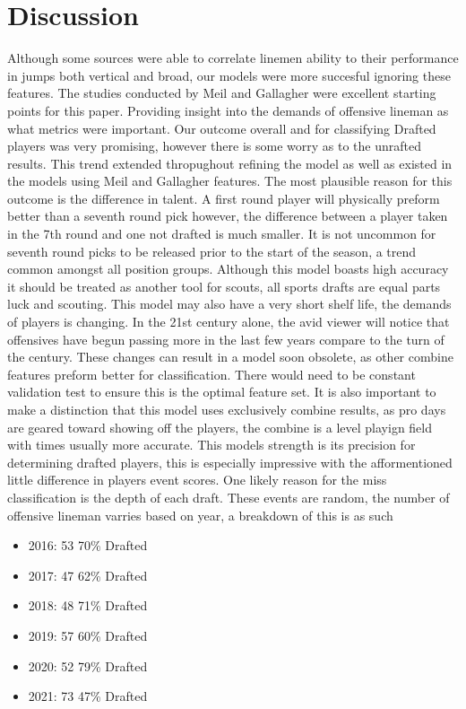 \documentclass[confrence]{IEEEtran}
\begin{document}
\section*{Discussion}
Although some sources were able to correlate linemen ability to their performance in jumps both vertical and broad, our models were more succesful ignoring these features.
The studies conducted by Meil and Gallagher were excellent starting points for this paper. Providing insight into the demands of offensive lineman as what metrics were important.
Our outcome overall and for classifying Drafted players was very promising, however there is some worry as to the unrafted results. 
This trend extended thropughout refining the model as well as existed in the models using Meil and Gallagher features.
The most plausible reason for this outcome is the difference in talent. A first round player will physically preform better than a seventh round pick however, the difference between a player taken in the 7th round and one not drafted is much smaller.
It is not uncommon for seventh round picks to be released prior to the start of the season, a trend common amongst all position groups.
Although this model boasts high accuracy it should be treated as another tool for scouts, all sports drafts are equal parts luck and scouting.
This model may also have a very short shelf life, the demands of players is changing. In the 21st century alone, the avid viewer will notice that offensives have begun passing more in the last few years compare to the turn of the century.
These changes can result in a model soon obsolete, as other combine features preform better for classification. 
There would need to be constant validation test to ensure this is the optimal feature set.
It is also important to make a distinction that this model uses exclusively combine results, as pro days are geared toward showing off the players, the combine is a level playign field with times usually more accurate.
This models strength is its precision for determining drafted players, this is especially impressive with the afformentioned little difference in players event scores.
One likely reason for the miss classification is the depth of each draft. These events are random, the number of offensive lineman varries based on year, a breakdown of this is as such
\begin{itemize}
    \item 2016: 53 70\% Drafted
    \item 2017: 47 62\% Drafted
    \item 2018: 48 71\% Drafted
    \item 2019: 57 60\% Drafted
    \item 2020: 52 79\% Drafted
    \item 2021: 73 47\% Drafted
  \end{itemize}
\end{document}

